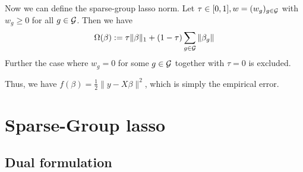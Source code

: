 \documentclass{article}
\begin{document}
Now we can define the sparse-group lasso norm. Let $\tau \in [0,1], w =(w_g)_{g \in \cal{G}}$  with $w_g \geq 0$ for all $g \in \cal{G}$. Then we have 
\begin{align}
\Omega(\beta): = \tau \|\beta\|_1 + (1-\tau)\sum_{g \in \cal{G}} \|\beta_g\|
\end{align}
Further the case where $w_g = 0$ for some $g \in \cal{G}$ together with $\tau = 0$ is excluded.

Thus,  we have  $f(\beta) = \frac{1}{2}\|y-X\beta\|^2$, which is simply the empirical error.  

\section{Sparse-Group lasso}

\subsection{Dual formulation}
\end{document}
